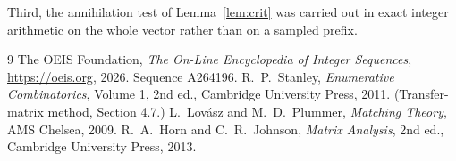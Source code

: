 \documentclass[11pt,a4paper]{article}
\theoremstyle{plain}
\theoremstyle{definition}
\begin{document}
Third, the annihilation test of Lemma~\ref{lem:crit} was carried out in exact integer
arithmetic on the whole vector rather than on a sampled prefix.

\begin{thebibliography}{9}
 The OEIS Foundation, \emph{The On-Line Encyclopedia of Integer
Sequences}, \url{https://oeis.org}, 2026. Sequence A264196.
 R.~P.~Stanley, \emph{Enumerative Combinatorics}, Volume 1, 2nd ed.,
Cambridge University Press, 2011. (Transfer-matrix method, Section 4.7.)
 L.~Lov\'asz and M.~D.~Plummer, \emph{Matching Theory}, AMS Chelsea, 2009.
 R.~A.~Horn and C.~R.~Johnson, \emph{Matrix Analysis}, 2nd ed., Cambridge
University Press, 2013.
\end{thebibliography}
\end{document}
